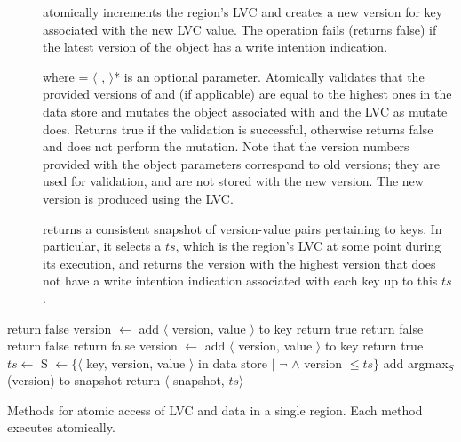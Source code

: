 \begin{description}
  \item[] atomically increments the region's LVC
  and creates a new version for key associated with the new LVC value. The
  operation fails (returns false) if the latest version of the object has a write intention
  indication. 
  \item []
 where \robjs = $\langle$ \rkey, \rversion $\rangle$*  is an optional parameter.
Atomically validates that the provided versions of \wkey and \rkeys (if
applicable)  are equal to the highest ones in the data store and mutates the
object associated with \wkey and the LVC as mutate does. Returns true if the
validation is successful, otherwise returns false and does not perform the
mutation. 
Note that the version numbers provided with the object parameters correspond to
old versions; they are used for validation, and are not stored with the new
version. The new version is produced using the LVC.
\item []   
returns a consistent snapshot of version-value pairs pertaining to keys. 
In particular, it selects a $ts$, which is the region's LVC at some point during its execution, and returns the version with the highest version that does not have a write intention indication associated with each key up to this $ts$. 
\end{description}

\begin{algorithm}[htb]
\begin{algorithmic}
return false
\EndIf
\State  version $\leftarrow$ 
\State add $\langle$ version, value $\rangle$ to key
\State return true
\EndProcedure
\Statex
%
	\State return false
\EndIf
{}
	\State return false
\EndIf
\ForAll{\rkey,\rversion}
    		\State return false
    	\EndIf
 \EndFor
\State  version $\leftarrow$ 
\State add $\langle$ version, value $\rangle$ to key
\State return true
\EndProcedure
\Statex
%
\State $ts \leftarrow$ 
	\State S $\leftarrow \{ \langle$
	key, version, value $\rangle$ in data store $|$ 
\State	$\neg$  $\wedge$ 
\State version $\leq ts \}$ 
	\State add argmax$_S$ (version) to snapshot
 \EndFor
\State return $\langle$ snapshot, $ts \rangle$
\EndProcedure

\end{algorithmic}
\caption{Methods for atomic access of LVC and data in a single region. Each method executes atomically.}
\label{alg:lvc-and-data}
\end{algorithm}


